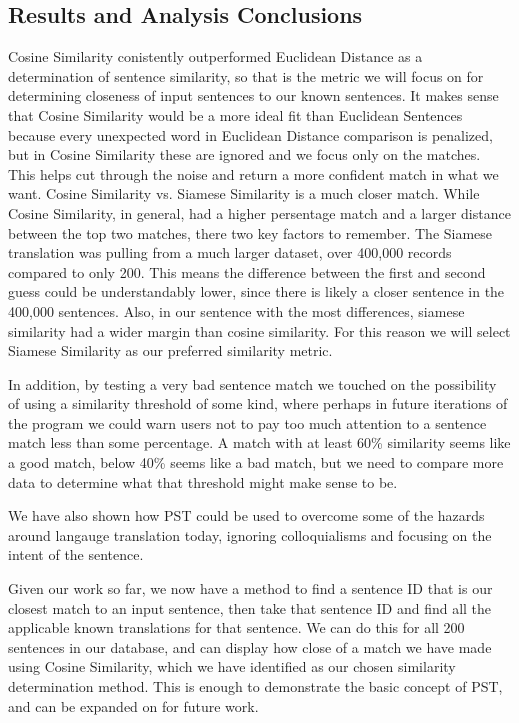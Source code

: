 \documentclass[runningheads]{llncs}
\begin{document}
	\subsection{Results and Analysis Conclusions}
	Cosine Similarity conistently outperformed Euclidean Distance as a determination of sentence similarity, so that is the metric we will focus on for determining closeness of input sentences to our known sentences. It makes sense that Cosine Similarity would be a more ideal fit than Euclidean Sentences because every unexpected word in Euclidean Distance comparison is penalized, but in Cosine Similarity these are ignored and we focus only on the matches. This helps cut through the noise and return a more confident match in what we want. 
	Cosine Similarity vs. Siamese Similarity is a much closer match. While Cosine Similarity, in general, had a higher persentage match and a larger distance between the top two matches, there two key factors to remember. The Siamese translation was pulling from a much larger dataset, over 400,000 records compared to only 200. This means the difference between the first and second guess could be understandably lower, since there is likely a closer sentence in the 400,000 sentences. Also, in our sentence with the most differences, siamese similarity had a wider margin than cosine similarity. For this reason we will select Siamese Similarity as our preferred similarity metric.

	In addition, by testing a very bad sentence match we touched on the possibility of using a similarity threshold of some kind, where perhaps in future iterations of the program we could warn users not to pay too much attention to a sentence match less than some percentage. A match with at least 60\% similarity seems like a good match, below 40\% seems like a bad match, but we need to compare more data to determine what that threshold might make sense to be.

	We have also shown how PST could be used to overcome some of the hazards around langauge translation today, ignoring colloquialisms and focusing on the intent of the sentence.

	Given our work so far, we now have a method to find a sentence ID that is our closest match to an input sentence, then take that sentence ID and find all the applicable known translations for that sentence. We can do this for all 200 sentences in our database, and can display how close of a match we have made using Cosine Similarity, which we have identified as our chosen similarity determination method. This is enough to demonstrate the basic concept of PST, and can be expanded on for future work.
\end{document}
